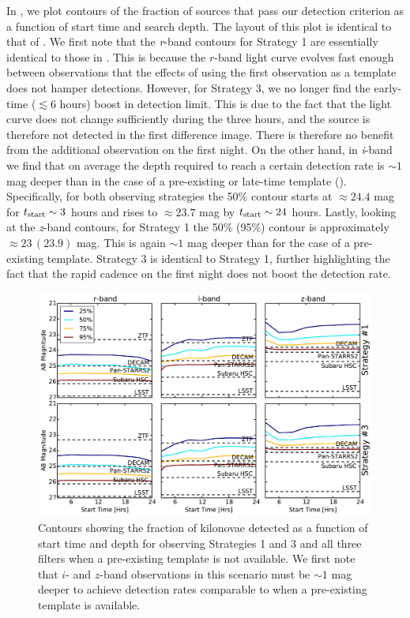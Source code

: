 In , we plot contours of the fraction of sources that pass our detection criterion as a function of start time and search depth. The layout of this plot is identical to that of . We first note that the {\em r}-band contours for Strategy 1 are essentially identical to those in . This is because the $r$-band light curve evolves fast enough between observations that the effects of using the first observation as a template does not hamper detections. However, for Strategy 3, we no longer find the early-time ($\lesssim6$ hours) boost in detection limit. This is due to the fact that the light curve does not change sufficiently during the three hours, and the source is therefore not detected in the first difference image. There is therefore no benefit from the additional observation on the first night. On the other hand, in {\em i}-band we find that on average the depth required to reach a certain detection rate is $\sim 1$ mag deeper than in the case of a pre-existing or late-time template (). Specifically, for both observing strategies the 50\% contour starts at $\approx24.4$ mag for $t_{{\rm start}} \sim 3$ hours and rises to $\approx 23.7$ mag by $t_{{\rm start}} \sim24$ hours. Lastly, looking at the {\em z}-band contours, for Strategy 1 the 50\% (95\%) contour is approximately $\approx 23\,(23.9)$ mag. This is again $\sim 1$ mag deeper than for the case of a pre-existing template. Strategy 3 is identical to Strategy 1, further highlighting the fact that the rapid cadence on the first night does not boost the detection rate.

\begin{figure}[t!]
\centering
\includegraphics[width=\textwidth]{./figs/chapter2/f12.pdf}
\caption{\singlespace Contours showing the fraction of kilonovae detected as a function of start time and depth for observing Strategies 1 and 3 and all three filters when a pre-existing template is not available. We first note that $i$- and $z$-band observations in this scenario must be $\sim1$ mag deeper to achieve detection rates comparable to when a pre-existing template is available.}
\label{fig:ch2_detdiff}
\end{figure}

